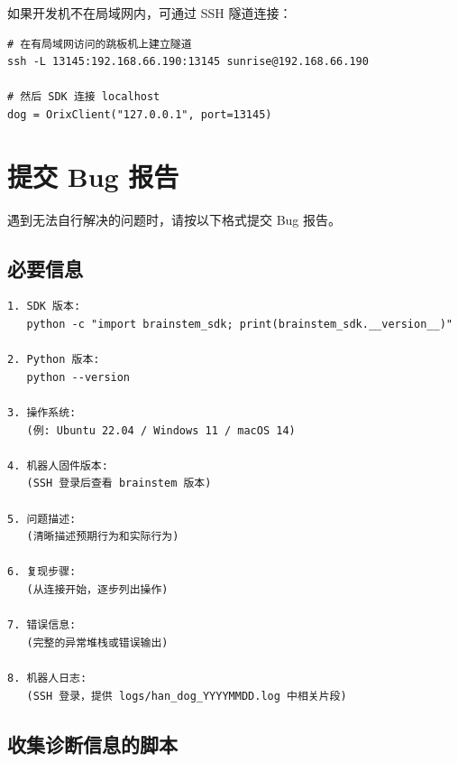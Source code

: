 \documentclass[a4paper,11pt,openany]{book}
\begin{document}
如果开发机不在局域网内，可通过 SSH 隧道连接：

\begin{lstlisting}[style=bash]
# 在有局域网访问的跳板机上建立隧道
ssh -L 13145:192.168.66.190:13145 sunrise@192.168.66.190

# 然后 SDK 连接 localhost
dog = OrixClient("127.0.0.1", port=13145)
\end{lstlisting}

\section{提交 Bug 报告}

遇到无法自行解决的问题时，请按以下格式提交 Bug 报告。

\subsection{必要信息}

\begin{lstlisting}[style=plain,numbers=none]
1. SDK 版本:
   python -c "import brainstem_sdk; print(brainstem_sdk.__version__)"

2. Python 版本:
   python --version

3. 操作系统:
   (例: Ubuntu 22.04 / Windows 11 / macOS 14)

4. 机器人固件版本:
   (SSH 登录后查看 brainstem 版本)

5. 问题描述:
   (清晰描述预期行为和实际行为)

6. 复现步骤:
   (从连接开始，逐步列出操作)

7. 错误信息:
   (完整的异常堆栈或错误输出)

8. 机器人日志:
   (SSH 登录，提供 logs/han_dog_YYYYMMDD.log 中相关片段)
\end{lstlisting}

\subsection{收集诊断信息的脚本}
\end{document}
